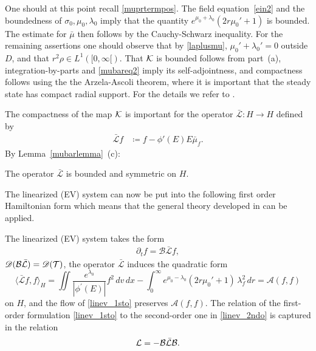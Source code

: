 \documentclass[11pt]{article}
\begin{document}
%
%
One should at this point recall \eqref{muprtermpos}.
The field equation~\eqref{ein2} and the boundedness of
$\sigma_0,\mu_0,\lambda_0$ imply that the quantity
$e^{\mu_0+\lambda_0}(2 r \mu_0'+1)$ is bounded.
The estimate for $\bar\mu$ then follows by the Cauchy-Schwarz inequality.
For the remaining assertions one should observe that
by \eqref{laplusmu}, $\mu_0'+\lambda_0'=0$ outside $D$, and
that $r^2 \rho\in L^1([0,\infty[)$. That ${\cal K}$ is bounded follows from part~(a),
integration-by-parts and \eqref{mubareq2} imply its self-adjointness,
and compactness follows using the the Arzela-Ascoli theorem, where it
is important that the steady state has compact radial support.
For the details we refer to \cite[Lemmata~4.17, 4.18]{HaLinRe}.

The compactness of the map ${\cal K}$ is important for the operator
$\bar{\mathcal L} \colon H \to H$ defined by
\begin{align}
  \bar{\mathcal L} f & \coloneqq
  f - \phi'(E)E \bar\mu_f. \label{barLdef}
\end{align}
By Lemma~\ref{mubarlemma}~(c):
%
\begin{lemma}
  The operator $\bar{\mathcal L}$
  is bounded and symmetric on $H$.
\end{lemma}
%
The linearized (EV) system can now be put into
the following first order Hamiltonian form
which means that the general theory
developed in \cite{LinZeng2017} can be applied.
%
%
\begin{proposition} \label{L:EVLIN1}
  The linearized (EV) system takes the form
  \begin{align}\label{linev_1sto}
    \partial_t f = \mathcal B \bar{\mathcal L} f,
  \end{align}
  ${\mathscr D}(\mathcal B \bar{\mathcal L})={\mathscr D}(\mathcal T)$,
  the operator $\bar{\mathcal L}$ induces the
  quadratic form 
  \begin{equation}\label{qformbarL}
    \langle\bar{\mathcal L} f,f\rangle_H
    = \iint \frac{e^{\lambda_{0}}}{|\phi^{\prime }(E)|}
    f^2\,dv\,dx
    - \int_0^\infty e^{\mu_0-\lambda_0}
    \left( 2r\mu_0'+1\right) \,\lambda_f^2\,dr = \mathcal A(f,f)
  \end{equation}
  on $H$, and the flow of \eqref{linev_1sto} preserves $\mathcal A(f,f)$.
  The relation of the first-order formulation \eqref{linev_1sto}
  to the second-order one in \eqref{linev_2ndo} is captured in the relation
  \begin{equation} \label{LBrel}
    {\cal L} = -{\cal B} \bar{{\cal L}} {\cal B}.
  \end{equation}
\end{proposition}
\end{document}
